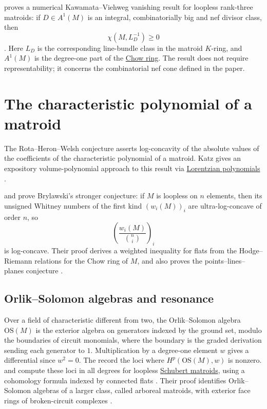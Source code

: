  proves a numerical Kawamata--Viehweg vanishing result
for loopless rank-three matroids: if $D\in A^1(M)$ is an integral,
combinatorially big and nef divisor class, then
\[
 \chi(M,L_D^{-1})\geq0
\]
\cite[Def.~1.1 and Thm.~A]{Cheng2026Vanishing}.
Here $L_D$ is the corresponding line-bundle class in the matroid $K$-ring,
and $A^1(M)$ is the degree-one part of the
\hyperref[matroidChowRing]{Chow ring}. The result does not require
representability; it concerns the combinatorial nef cone defined in the paper.


\section[matroidCharacteristicPolynomial]{The characteristic polynomial of a matroid}

The Rota--Heron--Welsh conjecture asserts log-concavity of the absolute
values of the coefficients of the characteristic polynomial of a matroid.
Katz gives an expository
volume-polynomial approach to this result via
\hyperref[lorentzianPolynomial]{Lorentzian polynomials}
\cite{Katz2025x}.

 and  prove Brylawski's stronger
conjecture: if $M$ is loopless on $n$ elements, then its unsigned Whitney
numbers of the first kind $(w_i(M))_i$ are ultra-log-concave of order $n$, so
\[
  \left(\frac{w_i(M)}{\binom{n}{i}}\right)_i
\]
is log-concave.  Their proof derives a weighted inequality for flats from the
Hodge--Riemann relations for the Chow ring of $M$, and also proves the
points--lines--planes conjecture \cite{DongLiu2026x}.


\subsection[matroidResonance]{Orlik--Solomon algebras and resonance}

Over a field of characteristic different from two, the Orlik--Solomon
algebra $\mathrm{OS}(M)$ is the exterior algebra on generators indexed by
the ground set, modulo the boundaries of circuit monomials, where the
boundary is the graded derivation sending each generator to $1$.
Multiplication by a degree-one element $w$ gives a differential since
$w^2=0$. The  record the loci where
$H^p(\mathrm{OS}(M),w)$ is nonzero.
 and  compute these loci in
all degrees for loopless \hyperref[schubertMatroidDefinition]{Schubert matroids},
using a cohomology formula indexed by connected flats
\cite[Thm.~1.2]{DenhamUdanshive2026x}.
Their proof identifies Orlik--Solomon algebras of a larger class, called
arboreal matroids, with exterior face rings of broken-circuit complexes
\cite[Thm.~1.4]{DenhamUdanshive2026x}.

